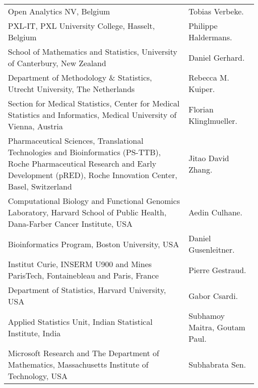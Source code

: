 \documentclass[10pt]{article}
\begin{document}
\begin{tabular}{@{}p{3.5in}p{4in}}
Open Analytics NV, Belgium & Tobias Verbeke. \\
PXL-IT, PXL University College, Hasselt, Belgium & Philippe Haldermans. \\
School of Mathematics and Statistics, University of Canterbury, New Zealand & Daniel Gerhard. \\
Department of Methodology \& Statistics, Utrecht University, The Netherlands & Rebecca M. Kuiper. \\
Section for Medical Statistics, Center for Medical Statistics and Informatics, Medical University of Vienna, Austria & Florian Klinglmueller. \\
Pharmaceutical Sciences, Translational Technologies and Bioinformatics (PS-TTB), Roche Pharmaceutical Research and Early Development (pRED), Roche Innovation Center, Basel, Switzerland & Jitao David Zhang. \\
Computational Biology and Functional Genomics Laboratory, Harvard School of Public Health, Dana-Farber Cancer Institute, USA & Aedin Culhane. \\
Bioinformatics Program, Boston University, USA & Daniel Gusenleitner. \\
Institut Curie, INSERM U900 and Mines ParisTech, Fontainebleau and Paris, France & Pierre Gestraud. \\
Department of Statistics, Harvard University, USA & Gabor Csardi. \\
Applied Statistics Unit, Indian Statistical Institute, India & Subhamoy Maitra, Goutam Paul. \\
Microsoft Research and The Department of Mathematics, Massachusetts Institute of Technology, USA & Subhabrata Sen. \\
\end{tabular}
\end{document}
